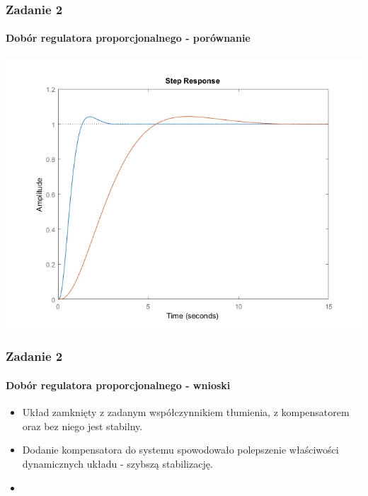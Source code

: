 \documentclass{beamer}
\begin{document}
\begin{frame}\frametitle{Zadanie 2}\framesubtitle{Dobór regulatora proporcjonalnego - porównanie}
\centering	\includegraphics[scale=0.5]{step-oba.png}
\end{frame}

\begin{frame}\frametitle{Zadanie 2}\framesubtitle{Dobór regulatora proporcjonalnego - wnioski}
	\begin{itemize}
		\item Układ zamknięty z zadanym współczynnikiem tłumienia, z kompensatorem oraz bez niego jest stabilny.
		\item Dodanie kompensatora do systemu spowodowało polepszenie właściwości dynamicznych układu - szybszą stabilizację.
		\item 
	\end{itemize}
\end{frame}
\end{document}
